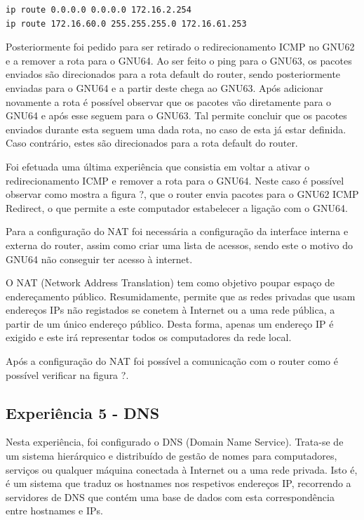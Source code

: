 \documentclass[article, a4paper, 11pt, oneside]{memoir}
\begin{document}
\begin{lstlisting} 
ip route 0.0.0.0 0.0.0.0 172.16.2.254
ip route 172.16.60.0 255.255.255.0 172.16.61.253
\end{lstlisting} 

Posteriormente foi pedido para ser retirado o redirecionamento ICMP no GNU62 e a remover a rota para o GNU64.
Ao ser feito o ping para o GNU63, os pacotes enviados são direcionados para a rota default do router, sendo posteriormente enviadas para o GNU64 e a partir deste
chega ao GNU63. Após adicionar novamente a rota é possível observar que os pacotes vão diretamente para o GNU64 e após esse seguem para o GNU63. Tal
permite concluir que os pacotes enviados durante esta seguem uma dada rota, no caso de esta já estar definida.
Caso contrário, estes são direcionados para a rota default do router.

Foi efetuada uma última experiência que consistia em voltar a ativar o redirecionamento ICMP e remover a rota para o GNU64. Neste caso é possível observar como
mostra a figura ?, que o router envia pacotes para o GNU62 ICMP Redirect, o que permite a este computador estabelecer a ligação com o GNU64.

Para a configuração do NAT foi necessária a configuração da interface interna e externa do router, assim como criar uma lista de acessos, sendo este o motivo
do GNU64 não conseguir ter acesso à internet.

O NAT (Network Address Translation) tem como objetivo poupar espaço de endereçamento público.
Resumidamente, permite que as redes privadas que usam endereços IPs não registados se conetem à Internet ou a uma rede pública,
a partir de um único endereço público. 
Desta forma, apenas um endereço IP é exigido e este irá representar todos os computadores da rede local.
 
Após a configuração do NAT foi possível a comunicação com o router como é possível verificar na figura ?.

\subsection{Experiência 5 - DNS}			

Nesta experiência, foi configurado o DNS (Domain Name Service). Trata-se de um sistema hierárquico e distribuído de gestão de nomes para computadores, serviços ou qualquer máquina conectada à
 Internet ou a uma rede privada.
Isto é, é um sistema que traduz os hostnames nos respetivos endereços IP, 
recorrendo a servidores de DNS que contém uma base de dados com esta correspondência entre hostnames e IPs.
\end{document}
